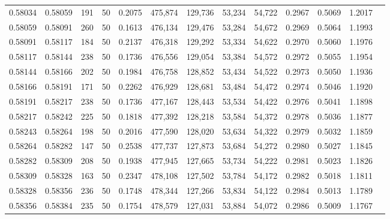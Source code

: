 \begin{tabular}{rrrrrrrrrrrrr}
0.58034 & 0.58059 &   191 &  50 &                                     0.2075 & 475,874 & 129,736 &  53,234 &  54,722 & 0.2967 & 0.5069 & 1.2017 \\
0.58059 & 0.58091 &   260 &  50 &                                     0.1613 & 476,134 & 129,476 &  53,284 &  54,672 & 0.2969 & 0.5064 & 1.1993 \\
0.58091 & 0.58117 &   184 &  50 &                                     0.2137 & 476,318 & 129,292 &  53,334 &  54,622 & 0.2970 & 0.5060 & 1.1976 \\
0.58117 & 0.58144 &   238 &  50 &                                     0.1736 & 476,556 & 129,054 &  53,384 &  54,572 & 0.2972 & 0.5055 & 1.1954 \\
0.58144 & 0.58166 &   202 &  50 &                                     0.1984 & 476,758 & 128,852 &  53,434 &  54,522 & 0.2973 & 0.5050 & 1.1936 \\
0.58166 & 0.58191 &   171 &  50 &                                     0.2262 & 476,929 & 128,681 &  53,484 &  54,472 & 0.2974 & 0.5046 & 1.1920 \\
0.58191 & 0.58217 &   238 &  50 &                                     0.1736 & 477,167 & 128,443 &  53,534 &  54,422 & 0.2976 & 0.5041 & 1.1898 \\
0.58217 & 0.58242 &   225 &  50 &                                     0.1818 & 477,392 & 128,218 &  53,584 &  54,372 & 0.2978 & 0.5036 & 1.1877 \\
0.58243 & 0.58264 &   198 &  50 &                                     0.2016 & 477,590 & 128,020 &  53,634 &  54,322 & 0.2979 & 0.5032 & 1.1859 \\
0.58264 & 0.58282 &   147 &  50 &                                     0.2538 & 477,737 & 127,873 &  53,684 &  54,272 & 0.2980 & 0.5027 & 1.1845 \\
0.58282 & 0.58309 &   208 &  50 &                                     0.1938 & 477,945 & 127,665 &  53,734 &  54,222 & 0.2981 & 0.5023 & 1.1826 \\
0.58309 & 0.58328 &   163 &  50 &                                     0.2347 & 478,108 & 127,502 &  53,784 &  54,172 & 0.2982 & 0.5018 & 1.1811 \\
0.58328 & 0.58356 &   236 &  50 &                                     0.1748 & 478,344 & 127,266 &  53,834 &  54,122 & 0.2984 & 0.5013 & 1.1789 \\
0.58356 & 0.58384 &   235 &  50 &                                     0.1754 & 478,579 & 127,031 &  53,884 &  54,072 & 0.2986 & 0.5009 & 1.1767 \\

\end{tabular}
